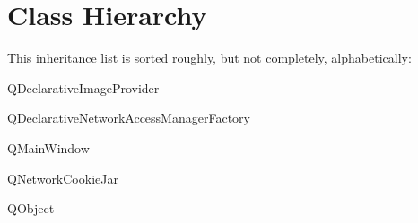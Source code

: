 \section{Class Hierarchy}
This inheritance list is sorted roughly, but not completely, alphabetically\-:\begin{DoxyCompactList}
\item {}
\item {}
\item Q\-Declarative\-Image\-Provider\begin{DoxyCompactList}
\item {}
\end{DoxyCompactList}
\item Q\-Declarative\-Network\-Access\-Manager\-Factory\begin{DoxyCompactList}
\item {}
\end{DoxyCompactList}
\item Q\-Main\-Window\begin{DoxyCompactList}
\item {}
\end{DoxyCompactList}
\item Q\-Network\-Cookie\-Jar\begin{DoxyCompactList}
\item {}
\end{DoxyCompactList}
\item Q\-Object\begin{DoxyCompactList}
\item {}
\item {}
\end{DoxyCompactList}
\end{DoxyCompactList}
